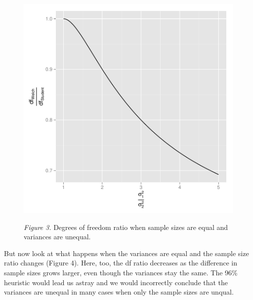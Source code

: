\documentclass[man,a4paper,noextraspace,apacite]{apa6}
\begin{document}
\begin{figure}
\includegraphics{WelchManuscript-abridged-dfratiosDiffvars}

\textit{Figure 3.} Degrees of freedom ratio when sample sizes are equal and variances are unequal.
\end{figure}

    But now look at what happens when the variances are equal and the sample size ratio changes (Figure 4). Here, too, the df ratio decreases as the difference in sample sizes grows larger, even though the variances stay the same. The 96\% heuristic would lead us astray and we would incorrectly conclude that the variances are unequal in many cases when only the sample sizes are unqual.
\end{document}

